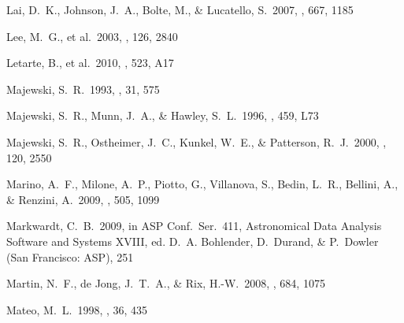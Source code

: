 \documentclass{emulateapj}
\begin{document}
\begin{thebibliography}{}
 Lai, D.~K., Johnson, J.~A., Bolte,
  M., \& Lucatello, S.\ 2007, \apj, 667, 1185


 Lee, M.~G., et al.\ 2003, \aj, 126,
  2840

 Letarte, B., et al.\ 2010, \aap,
  523, A17



 Majewski, S.~R.\ 1993, \araa, 31, 575

 Majewski, S.~R., Munn, J.~A.,
  \& Hawley, S.~L.\ 1996, \apjl, 459, L73

 Majewski, S.~R., Ostheimer,
  J.~C., Kunkel, W.~E., \& Patterson, R.~J.\ 2000, \aj, 120, 2550




 Marino, A.~F., Milone, A.~P.,
  Piotto, G., Villanova, S., Bedin, L.~R., Bellini, A., \& Renzini,
  A.\ 2009, \aap, 505, 1099

 Markwardt, C.~B.\ 2009, in ASP
  Conf.\ Ser.\ 411, Astronomical Data Analysis Software and Systems
  XVIII, ed. D.~A. Bohlender, D.~Durand, \& P.~Dowler (San Francisco:
  ASP), 251

 Martin, N.~F., de Jong, J.~T.~A.,
  \& Rix, H.-W.\ 2008, \apj, 684, 1075


 Mateo, M.~L.\ 1998, \araa, 36, 435 


\end{thebibliography}
\end{document}
